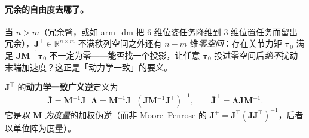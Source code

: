 \paragraph{冗余的自由度去哪了。}
当 $n>m$（冗余臂，或如 arm\_dm 把 $6$ 维位姿任务降维到 $3$ 维位置任务而留出冗余），$\mathbf{J}^\top\in\mathbb{R}^{n\times m}$ 不满秩列空间之外还有 $n-m$ 维\emph{零空间}：存在关节力矩 $\boldsymbol{\tau}_0$ 满足 $\mathbf{J}\mathbf{M}^{-1}\boldsymbol{\tau}_0$ 不一定为零——能否找一个投影，让任意 $\boldsymbol{\tau}_0$ 投进零空间后\emph{绝不}扰动末端加速度？这正是「动力学一致」的要义。

\begin{definition}[动力学一致广义逆]
\label{def:actrl-jbar}
$\mathbf{J}^\top$ 的\textbf{动力学一致广义逆}定义为
\begin{equation}
  \boxed{\bar{\mathbf{J}}=\mathbf{M}^{-1}\mathbf{J}^\top\boldsymbol{\Lambda}=\mathbf{M}^{-1}\mathbf{J}^\top(\mathbf{J}\mathbf{M}^{-1}\mathbf{J}^\top)^{-1},\qquad \bar{\mathbf{J}}^\top=\boldsymbol{\Lambda}\mathbf{J}\mathbf{M}^{-1}.}
  \label{eq:actrl-jbar}
\end{equation}
它是\emph{以 $\mathbf{M}$ 为度量}的加权伪逆（而非 Moore--Penrose 的 $\mathbf{J}^+=\mathbf{J}^\top(\mathbf{J}\mathbf{J}^\top)^{-1}$，后者以单位阵为度量）。
\end{definition}

